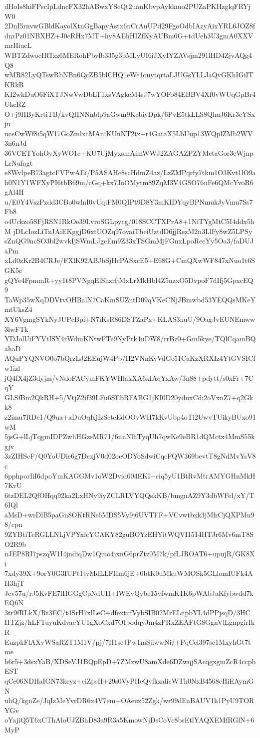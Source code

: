 dHoIs8hiFPscIpLdncFX32hABwxYScQt2uanKbvpAykkmo2PUZaPKHzglqFRYjW0
2DnI5rnvwGBldKayolXtnGgBapyAstx6nCrAuUPd29FgoOdbIAzyAixYRL6JOZ8f
dnrPz01NBXHZ+J0cRHx7MT+hy8AEhHIZfKyAUBm6G+tdUeh3U3gmA0XXVmrHiucL
WBTZdwocIRTzz6MERohPbvfb335g3pMLyUI6iJXyIYZAVsjm291lHD4ZjvAQg4Q8
wMR82LyQTswRbNBn6QcZB5blCHQ1eWe1ouytqrtaLJUGsYLLJaQvGKhIGiITKRkB
KI2wkDuO6FiXTJNwVwDbLT1xsVAgkeM4sJ7wYOFo84EBBV4Xf0vWUqGpBr4UkeRZ
O+j9HByKrtiTB/kvQHNNnblp9aGwm9KcbiyDpk/6PvE5tkLLS8QhuJ6Kr3eYSxju
uceCwWf8i5qW17GoZmlxcMAmKUnNT2tz+r4GataX5LbUup13WQplZMb2WV3n6nJd
36VCETYohOvXyWO1c+KU7UjMyxsmAimWWJ2ZAGAZPZYMctaGor3eWjnpLrNufagt
e8WvlpeB73agtcFVPwAEi/P5ASAHc8scHdmZ4az/LzZMPqrfy7tkm1O3Kvt1lO9a
h0N1Y1WFXyPI6tbB69m/cGq+kx7JoOMytm89ZqM3V4GSO76uFe6QMcYvoR6gAl4H
u/E0Y4VszPzdd3CBo0wlnI0vUqjFM0QIPt9D8Y3mKIDYqyBPNmukJyVmu7Ss7Fb8
o4Uckzo5SFjRSN1RkOe39LvroSGLpycg/018SCCTXPrA8+1NiTYgMtC5I4ddx5hM
jDLcIozLiTzJAiEKggjD6xtUOZq97ovaiTbeiUztdD6jjRezM2n3LlFy8wZ5LPSy
sZnQG9ncSO3bl2wvkIjSWmLJgcEm9Z33xTSGmMjFGnxLpoReeYy5Oa3/faDUJaPm
xLd0zKr2B4CRJe/FXlK92ABJbSjHcPASxcE5+E68G+CmQXwWF847xNuo1t6SGK5c
gQYe4FpmmR+yy1t8PVNgqEfShzrfjMxLrMkHbl4Z5nzxO5DvpoF7dIfj5GpxcEQ9
TaWp35wXqDDVtvOHBalN7CaKmSUZntD09qVKeCNjJBmwbd53YEQQsMKeYmtUksZ4
XY6VgmgSYkNyJUPcBpi+N7iKsR86DSTZaPx+KLAS3nuU/9OagJvEUNEmww3lwFTk
YDJolUiFYVtISY4rWdmKNtwFTe9NyPtk4uDW8/rrBz0+Gm5kye/TQlCqamBQahaD
AQuPYQNVO0o7bQrzLJ2EEujW4Pb/H2VNnKvVdGc51CaKzXRXIz4YtGVSICfw1izl
jQ4fX4jZ3dyjm/vNdoFACymFKYWHlakXA6xIAqYxAw/3n88+pdytt/s0xFr+7CqY
GLSfBm2QkRH+5/VtjZ2if39LFu6SEbRFABG1jKI0D20yduxCdi2oVxnZ7+q2Gkk8
z2imu7RDe1/Q9ua+aDuOqKjIzScteEdOOvWH7kKvUbp4oTi2UwvTUikyBUxo91wM
5jsG+lLjTqgmIDPZwhHGzsMR71/6nnNlhTyqUh7qwKe9eBR1dQMctx4MmS55kgjv
3zZIHScF/Q0YoUDie6g7DcxjV0d02oeODYoSdwiCqcFQW369bevtT8gNdMvYsV8c
6pphporIiI6dpoYmKAGGMv1oW2Dvid604EKI+ciq5yU1BtRvMtrAMYGHnMkH7KvU
6tzDEL2QfOHqq92ka2LxHNy9iyZCLRLVYQQskKB/bmgnAZ9Y3dbWFel/xY/T6IQl
aMsD+wrDlB5paGn8OKtRNs6MDS5Vy9j6UVTFF+VCvwtbxk3jMlrCjQXPMu98/cpn
9ZYBtiTeRGLLNLjVPYxicYCAKY82guBOYzEHYitWQVI1514HTJr6Mv6mT8SO2R9b
nJEP8RI7pszqW1I4jndiqDw1Qmo4jxnG6prZtz0M7k/pfLJROAT6+upujR/GK8Xi
7xdy39X+9orY0G3IUPt1tvMdLLFHm6jE+0btK0uMkuWMOSk5GLlomIUFk4AH3hjT
Jcv57u/rJ5KvFE7lHGGgCpNdUH+IWEyQybe15vfwmK1K6pWAbJaKfybwdd7kEQ6N
3tr9fRLkX/Rt3EC/t4SrH7xlLeC+dfextufVybSIB02MrELnpbYL4dPPjsqD/3HC
HTZjz/hLFTuyuKdvacYU1gXoCxd7OIbodqyJm4zPRxZEAFtG8GgnVlLgnpgirIkR
EuzpkFlAXvWSaRZT1M1V/pj/7H1seJPw1mSjiwwNi/+PqCcl397sc1MxyhGt7tme
b6r5+3dsxYaB/XDSeVJ1BQpEpD+7ZMzwU8amXde6DZwqjSAcqgxgmZcR4ccpbEST
qCe06NDHaIGN73kcyz+eiZpsH+29s0VyPHeQvfkzalicWTh0NxB4568cHiEAymGN
uhQ/kgnZe/JqIzMeYvrDR6x4V7em+OAeuz52Zgk/wr99dEaBAUV1h1PyU9TORYGv
oYajiQ5T6xCThAloUJZBhD83a9R3a5KmowNjDsCoVc8bsEtlYAQXEMfRGlN+6MyP
